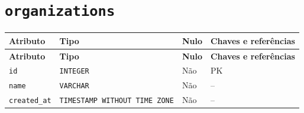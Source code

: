 \section*{\texttt{organizations}}
\begingroup\footnotesize
\setlength{\tabcolsep}{4pt}\renewcommand{\arraystretch}{1.15}
\begin{longtable}{|>{\raggedright\arraybackslash}p{}|>{\raggedright\arraybackslash}p{}|>{\raggedright\arraybackslash}p{}|>{\raggedright\arraybackslash}p{}|}
\hline
\textbf{Atributo} & \textbf{Tipo} & \textbf{Nulo} & \textbf{Chaves e referências} \\ \hline
\endfirsthead
\hline \textbf{Atributo} & \textbf{Tipo} & \textbf{Nulo} & \textbf{Chaves e referências} \\ \hline
\endhead
\texttt{id} & \texttt{INTEGER} & Não & PK \\ \hline
\texttt{name} & \texttt{VARCHAR} & Não & -- \\ \hline
\texttt{created\_\allowbreak{}at} & \texttt{TIMESTAMP WITHOUT TIME ZONE} & Não & -- \\ \hline
\end{longtable}
\endgroup

